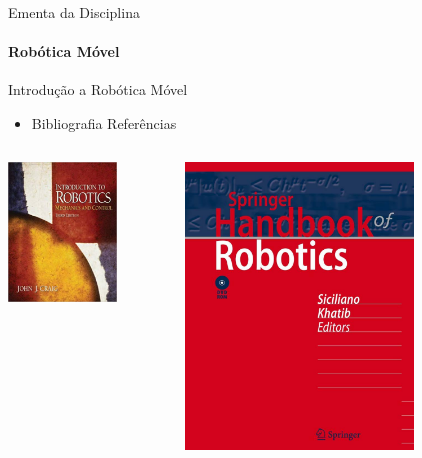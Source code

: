 \documentclass{beamer}
\begin{document}
\begin{frame}[c]{Ementa da Disciplina}
	\framesubtitle{Robótica Móvel}
	\begin{block}{Introdução a Robótica Móvel}
	\end{block}
	\begin{itemize}
		\item Bibliografia Referências
	\end{itemize}
	\begin{columns}[c]
		\begin{column}{0.5\textwidth}
			\center
			\includegraphics[width=0.7\textwidth]{./images/livro6}
		\end{column}
		\begin{column}{0.5\textwidth}
			\center
			\includegraphics[width=0.7\textwidth]{./images/livro5}
		\end{column}
	\end{columns}
\end{frame}
\end{document}
